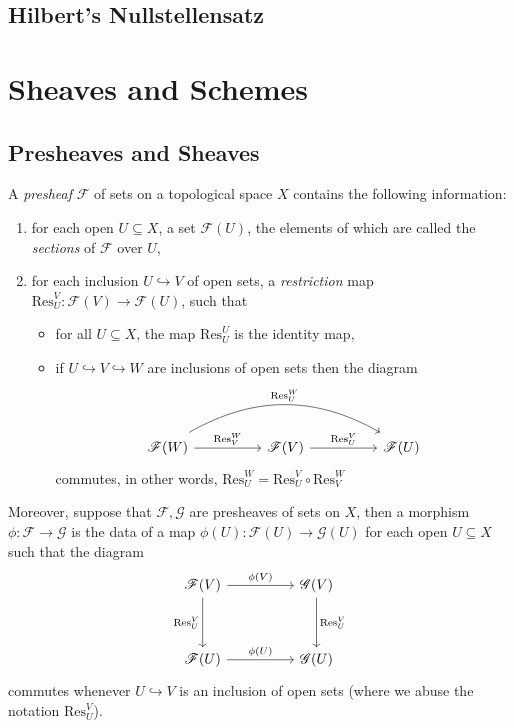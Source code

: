 \documentclass[11pt]{book}
\begin{document}
\section{Hilbert's Nullstellensatz}

\chapter{Sheaves and Schemes}
\section{Presheaves and Sheaves}
\begin{definition}A \textit{presheaf} $\mathscr{F}$ of sets on a topological space $X$ contains the following information:
\begin{enumerate}[label=(\roman*)]
	\item for each open $U\subseteq X$, a set $\mathscr{F}(U)$, the elements of which are called the \textit{sections} of $\mathscr{F}$ over $U$,
	\item for each inclusion $U\hookrightarrow V$ of open sets, a \textit{restriction} map $\mathrm{Res}^V_U:\mathscr{F}(V)\rightarrow\mathscr{F}(U)$, such that
	\begin{itemize}
		\item for all $U\subseteq X$, the map $\mathrm{Res}^U_U$ is the identity map,
		\item if $U\hookrightarrow V \hookrightarrow W$ are inclusions of open sets then the diagram
		\[
		\begin{tikzcd}[sep=huge]
			\mathscr{F}(W) \arrow[r,"\mathrm{Res}^W_V"] \arrow[rr, "\mathrm{Res}^W_U", bend left, shift left=1] & \mathscr{F}(V) \arrow[r,"\mathrm{Res}^V_U"] & \mathscr{F}(U)
		\end{tikzcd}
		\]
		commutes, in other words, $\mathrm{Res}^W_U=\mathrm{Res}^V_U\circ \mathrm{Res}^W_V$
	\end{itemize}
\end{enumerate}
Moreover, suppose that $\mathscr{F},\mathscr{G}$ are presheaves of sets on $X$, then a morphism $\phi:\mathscr{F}\rightarrow\mathscr{G}$ is the data of a map $\phi(U):\mathscr{F}(U)\rightarrow\mathscr{G}(U)$ for each open $U\subseteq X$ such that the diagram
\[
\begin{tikzcd}[sep = huge]
\mathscr{F}(V) \arrow[r, "\phi(V)"] \arrow[d, "\mathrm{Res}^V_U"'] & \mathscr{G}(V) \arrow[d, "\mathrm{Res}^V_U"] \\
\mathscr{F}(U) \arrow[r, "\phi(U)"]                 & \mathscr{G}(U)               
\end{tikzcd}\]
commutes whenever $U\hookrightarrow V$ is an inclusion of open sets (where we abuse the notation $\mathrm{Res}^V_U$).
\end{definition}
\end{document}
